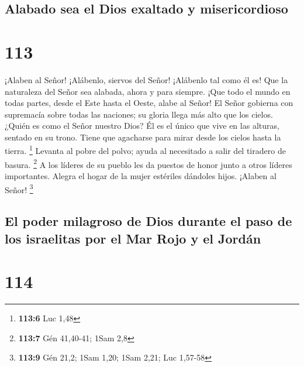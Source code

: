 \hypertarget{alabado-sea-el-dios-exaltado-y-misericordioso}{%
\subsection{Alabado sea el Dios exaltado y
misericordioso}\label{alabado-sea-el-dios-exaltado-y-misericordioso}}

\hypertarget{section-112}{%
\section{113}\label{section-112}}

 ¡Alaben al Señor! ¡Alábenlo, siervos del Señor! ¡Alábenlo
tal como él es!  Que la naturaleza del Señor sea alabada,
ahora y para siempre.  ¡Que todo el mundo en todas partes,
desde el Este hasta el Oeste, alabe al Señor!  El Señor
gobierna con supremacía sobre todas las naciones; su gloria llega más
alto que los cielos.  ¿Quién es como el Señor nuestro Dios?
Él es el único que vive en las alturas, sentado en su trono.
 Tiene que agacharse para mirar desde los cielos hasta la
tierra. \footnote{\textbf{113:6} Luc 1,48}  Levanta al pobre
del polvo; ayuda al necesitado a salir del tiradero de basura.
\footnote{\textbf{113:7} Gén 41,40-41; 1Sam 2,8}  A los
líderes de su pueblo les da puestos de honor junto a otros líderes
importantes.  Alegra el hogar de la mujer estériles dándoles
hijos. ¡Alaben al Señor! \footnote{\textbf{113:9} Gén 21,2; 1Sam 1,20;
  1Sam 2,21; Luc 1,57-58}

\hypertarget{el-poder-milagroso-de-dios-durante-el-paso-de-los-israelitas-por-el-mar-rojo-y-el-jorduxe1n}{%
\subsection{El poder milagroso de Dios durante el paso de los israelitas
por el Mar Rojo y el
Jordán}\label{el-poder-milagroso-de-dios-durante-el-paso-de-los-israelitas-por-el-mar-rojo-y-el-jorduxe1n}}

\hypertarget{section-113}{%
\section{114}\label{section-113}}

